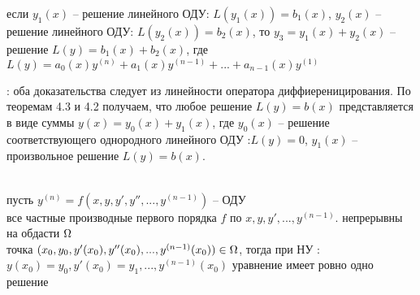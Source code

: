 \begin{theorem} 
если $y_1(x)$ -- решение линейного ОДУ: $L(y_1(x)) = b_1(x)$, $y_2(x)$ -- решение линейного ОДУ: $L(y_2(x)) = b_2(x)$, то $y_3 = y_1(x) + y_2(x)$ -- решение $L(y) = b_1(x) + b_2(x)$, где $L(y) = a_0(x)y^{(n)} + a_1(x)y^{(n-1)} + ... + a_{n-1}(x)y^{(1)}$
\end{theorem}
\beginproof: оба доказательства следует из линейности оператора диффиереницирования.
По теоремам 4.3 и 4.2 получаем, что любое решение $L(y) =b (x)$ представляется в виде суммы $y(x) = y_0(x) + y_{1}(x)$, где $y_0(x)$ -- решение соответствующего однородного линейного ОДУ :$L(y) = 0$, $y_1(x)$ -- произвольное решение $L(y) = b(x)$.

\begin{theorem} \\
пусть $y^{(n)} =  f(x, y, y' , y'', ... ,y^{(n-1)})$ -- ОДУ\\
все частные производные первого порядка $f$ по $x, y, y' , ... , y^{(n-1)}$. непрерывны на обдасти $\Omega$ \\
точка $(x_0, y_0 , y'(x_0), y''(x_0) , ... , y^{(n-1)}(x_0) ) \in \Omega$, тогда при НУ :  $y(x_0) = y_0 ,  y'(x_0) = y_1 , ... , y^{(n-1)}(x_0)$ уравнение имеет ровно одно решение

\end{theorem}




